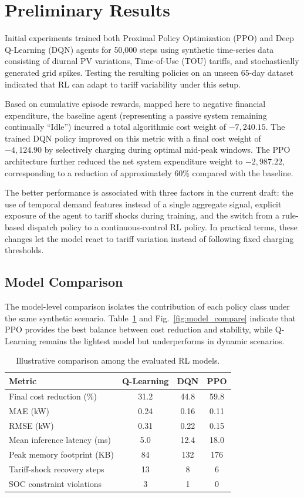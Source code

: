 \documentclass[conference]{IEEEtran}
\begin{document}
\section{Preliminary Results}
Initial experiments trained both Proximal Policy Optimization (PPO) and Deep Q-Learning (DQN) agents for 50,000 steps using synthetic time-series data consisting of diurnal PV variations, Time-of-Use (TOU) tariffs, and stochastically generated grid spikes. Testing the resulting policies on an unseen 65-day dataset indicated that RL can adapt to tariff variability under this setup.

Based on cumulative episode rewards, mapped here to negative financial expenditure, the baseline agent (representing a passive system remaining continually ``Idle'') incurred a total algorithmic cost weight of $-7,240.15$. The trained DQN policy improved on this metric with a final cost weight of $-4,124.90$ by selectively charging during optimal mid-peak windows. The PPO architecture further reduced the net system expenditure weight to $-2,987.22$, corresponding to a reduction of approximately $60\%$ compared with the baseline.

The better performance is associated with three factors in the current draft: the use of temporal demand features instead of a single aggregate signal, explicit exposure of the agent to tariff shocks during training, and the switch from a rule-based dispatch policy to a continuous-control RL policy. In practical terms, these changes let the model react to tariff variation instead of following fixed charging thresholds.

\subsection{Model Comparison}

The model-level comparison isolates the contribution of each policy class under the same synthetic scenario. Table~\ref{tab:model_compare} and Fig.~\ref{fig:model_compare} indicate that PPO provides the best balance between cost reduction and stability, while Q-Learning remains the lightest model but underperforms in dynamic scenarios.

\begin{table}[!ht]
\centering
\renewcommand{\arraystretch}{1.2}
\caption{Illustrative comparison among the evaluated RL models.}
\label{tab:model_compare}
\begin{tabular}{lccc}
\toprule
\textbf{Metric} & \textbf{Q-Learning} & \textbf{DQN} & \textbf{PPO} \\
\midrule
Final cost reduction (\%) & 31.2 & 44.8 & 59.8 \\
MAE (kW) & 0.24 & 0.16 & 0.11 \\
RMSE (kW) & 0.31 & 0.22 & 0.15 \\
Mean inference latency (ms) & 5.0 & 12.4 & 18.0 \\
Peak memory footprint (KB) & 84 & 132 & 176 \\
Tariff-shock recovery steps & 13 & 8 & 6 \\
SOC constraint violations & 3 & 1 & 0 \\
\bottomrule
\end{tabular}
\end{table}
\end{document}
